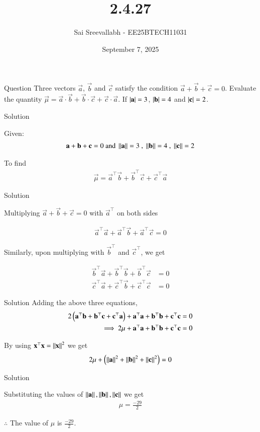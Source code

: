 \documentclass{beamer}
\title 
{2.4.27}
\date{September 7, 2025}
\author 
{Sai Sreevallabh - EE25BTECH11031}
\begin{document}
\frame{\titlepage}
\begin{frame}{Question}
Three vectors $\vec{a}$, $\vec{b}$ and $\vec{c}$ satisfy the condition $\vec{a}+\vec{b}+\vec{c}=0$. Evaluate the quantity $\vec{\mu} = \vec{a}\cdot\vec{b} + \vec{b}\cdot\vec{c} + \vec{c}\cdot\vec{a}$. If $\left\vert\mathbf{a}\right\vert = 3$, $\left\vert\mathbf{b}\right\vert=4$ and $\left\vert\mathbf{c}\right\vert=2$. \\
\end{frame}



\begin{frame}{Solution}

Given: 
\begin{align}
    \vec{a}+\vec{b}+\vec{c}=0 \ \text{and}\ \norm{\vec{a}}=3 \ , \ \norm{\vec{b}}=4 \ , \ \norm{\vec{c}}=2
\end{align}

To find
\begin{align}
    \vec{\mu} = \vec{a}^\top\vec{b}+\vec{b}^\top\vec{c}+\vec{c}^\top\vec{a}
\end{align}

\end{frame}

\begin{frame}{Solution}

Multiplying $\vec{a}+\vec{b} + \vec{c}=0$ with $\vec{a}^\top$ on both sides

\begin{align}
    \vec{a}^\top\vec{a} + \vec{a}^\top\vec{b} + \vec{a}^\top\vec{c} = 0
\end{align}

Similarly, upon multiplying with $\vec{b}^\top$ and $\vec{c}^\top$, we get 

\begin{align}
   \vec{b}^\top\vec{a} + \vec{b}^\top\vec{b} + \vec{b}^\top\vec{c} &= 0\\
   \vec{c}^\top\vec{a} + \vec{c}^\top\vec{b} + \vec{c}^\top\vec{c} &= 0
\end{align}

\end{frame}

\begin{frame}{Solution}
Adding the above three equations,
\begin{align}
    2\left(\mathbf{a}^\top\mathbf{b}+\mathbf{b}^\top\mathbf{c}+\mathbf{c}^\top\mathbf{a}\right) + \mathbf{a}^\top\mathbf{a}+\mathbf{b}^\top\mathbf{b}+\mathbf{c}^\top\mathbf{c} &= 0\\
   \implies 2\mu + \mathbf{a}^\top\mathbf{a}+\mathbf{b}^\top\mathbf{b}+\mathbf{c}^\top\mathbf{c} &= 0
\end{align}

By using $\mathbf{x}^\top\mathbf{x} = \left\lVert\mathbf{x}\right\rVert^2$ we get
\begin{align}
    2\mu + \left(\left\lVert\mathbf{a}\right\rVert^2 + \left\lVert\mathbf{b}\right\rVert^2 + \left\lVert\mathbf{c}\right\rVert^2\right) = 0
\end{align}

\end{frame}

\begin{frame}{Solution}

Substituting the values of $\left\lVert\mathbf{a}\right\rVert, \left\lVert\mathbf{b}\right\rVert, \left\lVert\mathbf{c}\right\rVert$ we get
\begin{align}
  \mu = \frac{-29}{2}
\end{align}

$\therefore$ The value of $\mu$ is $\frac{-29}{2}$.

\end{frame}
\end{document}
